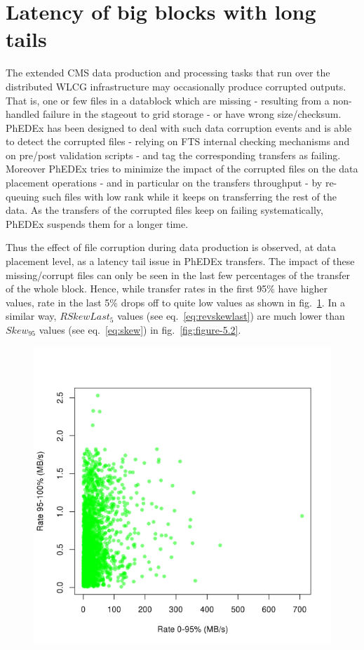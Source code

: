 \section{Latency of big blocks with long tails}

The extended CMS data production and processing tasks that run over
the distributed WLCG infrastructure may occasionally produce corrupted
outputs. That is, one or few files in a datablock which are missing -
resulting from a non-handled failure in the stageout to grid storage -
or have wrong size/checksum.  PhEDEx has been designed to deal with
such data corruption events and is able to detect the corrupted files
- relying on FTS internal checking mechanisms and on pre/post
validation scripts - and tag the corresponding transfers as
failing. Moreover PhEDEx tries to minimize the impact of the corrupted
files on the data placement operations - and in particular on the
transfers throughput - by re-queuing such files with low rank while it
keeps on transferring the rest of the data. As the transfers of the corrupted
files keep on failing systematically, PhEDEx suspends them for a
longer time.

Thus the effect of file corruption during data production is observed,
at data placement level, as a latency tail issue in PhEDEx transfers.
The impact of these missing/corrupt files can only be seen in the last
few percentages of the transfer of the whole block. Hence, while
transfer rates in the first 95\% have higher values, rate in the last
5\% drops off to quite low values as shown in
fig.~\ref{fig:figure-5.1}. In a similar way, $RSkewLast_5$ values (see
eq.~\ref{eq:revskewlast}) are much lower than $Skew_{95}$ values (see
eq.~\ref{eq:skew}) in fig.~\ref{fig:figure-5.2}.

\begin{figure}[htp]
\centering
\includegraphics{Figures/figure-51.pdf}
\caption{}\label{fig:figure-5.1}
\end{figure}

